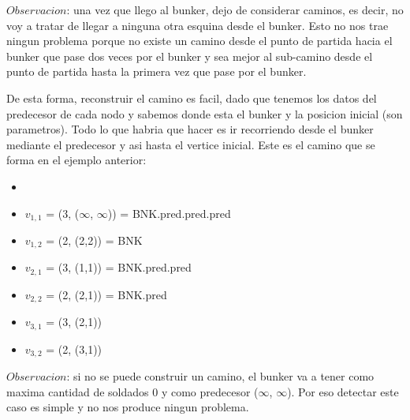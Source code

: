 
\medskip

$Observacion$: una vez que llego al bunker, dejo de considerar caminos, es decir, no voy a tratar de llegar a ninguna otra esquina desde el bunker. Esto no nos trae ningun problema porque no existe un camino desde el punto de partida hacia el bunker que pase dos veces por el bunker y sea mejor al sub-camino desde el punto de partida hasta la primera vez que pase por el bunker.

\medskip

De esta forma, reconstruir el camino es facil, dado que tenemos los datos del predecesor de cada nodo y sabemos donde esta el bunker y la posicion inicial (son parametros). Todo lo que habria que hacer es ir recorriendo desde el bunker mediante el predecesor y asi hasta el vertice inicial. Este es el camino que se forma en el ejemplo anterior:

\medskip

\begin{multicols}{2}
\columnbreak
\columnbreak
  \begin{itemize}[noitemsep]
      \item[]
      \item $v_{1,1}$ = (3, ($\infty$, $\infty$)) = BNK.pred.pred.pred
      \item $v_{1,2}$ = (2, (2,2)) = BNK
      \item $v_{2,1}$ = (3, (1,1)) = BNK.pred.pred
      \item $v_{2,2}$ = (2, (2,1)) = BNK.pred
      \item $v_{3,1}$ = (3, (2,1))
      \item $v_{3,2}$ = (2, (3,1))
    \end{itemize}
\end{multicols}

\medskip

$Observacion$: si no se puede construir un camino, el bunker va a tener como maxima cantidad de soldados 0 y como predecesor ($\infty$, $\infty$). Por eso detectar este caso es simple y no nos produce ningun problema.

